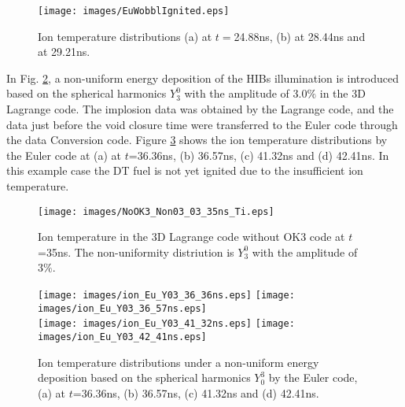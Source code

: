 \begin{figure}[H]
		\centering
		\texttt{[image: images/EuWobblIgnited.eps]}
		\caption{Ion temperature distributions (a) at $t=$24.88ns, (b) at 28.44ns and at 29.21ns.}\label{Ti_EuWobblIgnited}
\end{figure}

In Fig. \ref{NoOK3_03_Ti}, a non-uniform energy deposition of the HIBs illumination is introduced based on the spherical harmonics $Y_3^0$ with the amplitude of $3.0\%$ in the 3D Lagrange code. The implosion data was obtained by the Lagrange code, and the data just before the void closure time were transferred to the Euler code through the data Conversion code.  Figure \ref{Ti_Eu_Y03} shows the ion temperature distributions  by the Euler code at (a) at $t$=36.36ns, (b) 36.57ns, (c) 41.32ns and (d) 42.41ns. In this example case the DT fuel is not yet ignited due to the insufficient ion temperature. 

\begin{figure}[H]
		\centering
		\texttt{[image: images/NoOK3\_Non03\_03\_35ns\_Ti.eps]}
		\caption{Ion temperature in the 3D Lagrange code without OK3 code at $t$=35ns. The non-uniformity distriution is $Y_3^0$ with the amplitude of $3\%$.}\label{NoOK3_03_Ti}
\end{figure}


\begin{figure}[H]
		\centering
		\texttt{[image: images/ion\_Eu\_Y03\_36\_36ns.eps]}
		\texttt{[image: images/ion\_Eu\_Y03\_36\_57ns.eps]} \\
		\texttt{[image: images/ion\_Eu\_Y03\_41\_32ns.eps]}
		\texttt{[image: images/ion\_Eu\_Y03\_42\_41ns.eps]} \\
		\caption{Ion temperature distributions under a non-uniform energy deposition based on the spherical harmonics $Y_0^3$ by the Euler code,  (a) at $t$=36.36ns, (b) 36.57ns, (c) 41.32ns and (d) 42.41ns.}\label{Ti_Eu_Y03}
\end{figure}
\fi


